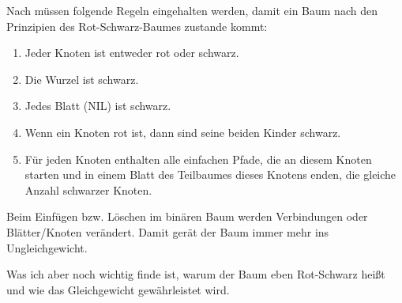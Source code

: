  
Nach \cite[S.311]{tcormen} müssen folgende Regeln eingehalten werden, damit ein Baum nach den Prinzipien des Rot-Schwarz-Baumes zustande kommt:

\begin{enumerate}
	\item Jeder Knoten ist entweder rot oder schwarz.
	\item Die Wurzel ist schwarz.
	\item Jedes Blatt (NIL) ist schwarz.
	\item Wenn ein Knoten rot ist, dann sind seine beiden Kinder schwarz.
	\item Für jeden Knoten enthalten alle einfachen Pfade, die an diesem Knoten starten und in einem Blatt des Teilbaumes dieses Knotens enden, die gleiche Anzahl schwarzer Knoten. 
\end{enumerate}


Beim Einfügen bzw. Löschen im binären Baum werden Verbindungen oder Blätter/Knoten verändert. Damit gerät der Baum immer mehr ins Ungleichgewicht. 


 Was ich aber noch wichtig finde ist, warum der Baum eben Rot-Schwarz heißt und wie das Gleichgewicht gewährleistet wird.